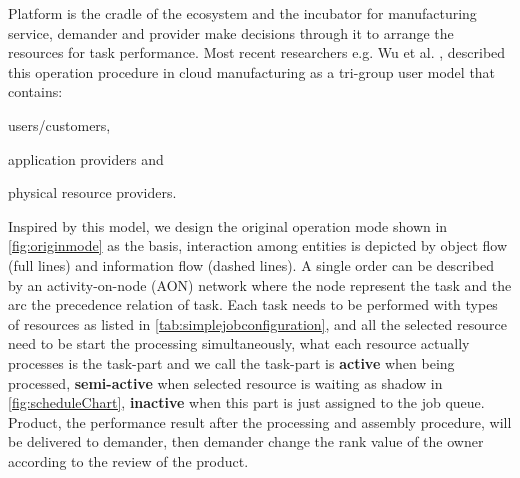 Platform is the cradle of the ecosystem and the incubator for manufacturing service, demander and provider make decisions through it to arrange the resources for task performance. Most recent researchers e.g. Wu et al. \cite{Wu2013}, described this operation procedure in cloud manufacturing as a tri-group user model that contains:\begin{inparaenum}[1)]
\item users/customers,
\item application providers and
\item physical resource providers.
\end{inparaenum}
Inspired by this model, we design the original operation mode shown in \autoref{fig:originmode} as the basis, interaction among entities is depicted by object flow (full lines) and information flow (dashed lines).
A single order can be described by an activity-on-node (AON) network where the node represent the task and the arc the precedence relation of task. Each task needs to be performed with types of resources as listed in \autoref{tab:simplejobconfiguration}, and all the selected resource need to be start the processing simultaneously, what each resource actually processes is the task-part and we call the task-part is \textbf{active} when being processed, \textbf{semi-active} when selected resource is waiting as shadow in \autoref{fig:scheduleChart}, \textbf{inactive} when this part is just assigned to the job queue. Product, the performance result after the processing and assembly procedure, will be delivered to demander, then demander change the rank value of the owner according to the review of the product. 

